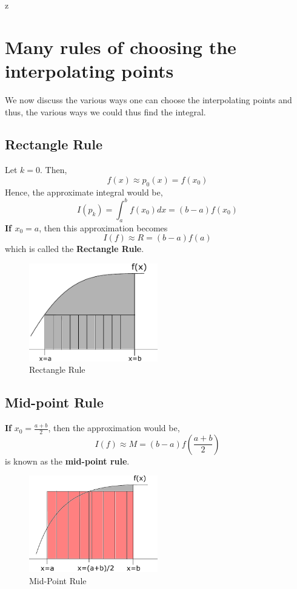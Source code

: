 z\documentclass[a4paper,12pt,twoside]{book}
\begin{document}
\section{Many rules of choosing the interpolating points}
We now discuss the various ways one can choose the interpolating points and thus, the various ways we could thus find the integral.
\subsection{Rectangle Rule}
Let $k = 0$. Then,
\[f(x) \approx p_0(x) = f(x_0)\]
Hence, the approximate integral would be,
\[I(p_k) = \int_a^bf(x_0) dx = (b-a)f(x_0)\]
\textbf{If $x_0 = a$}, then this approximation becomes
\begin{equation}
    I(f) \approx R = (b-a)f(a)
\end{equation}
which is called the \textbf{Rectangle Rule}.
\begin{figure}[h!]
    \centering
    \includegraphics[width=0.5\textwidth]{RectangleRule.pdf}
    \caption{Rectangle Rule}
    \label{fig:1}
\end{figure}
\subsection{Mid-point Rule}
\textbf{If} $x_0 = \frac{a+b}{2}$, then the approximation would be,
\begin{equation}
    I(f) \approx M = (b-a) f\left(\frac{a+b}{2}\right)
\end{equation}
is known as the \textbf{mid-point rule}.
\begin{figure}[h!]
    \centering
    \includegraphics[width = 0.5\textwidth]{MidPointRule.pdf}
    \caption{Mid-Point Rule}
    \label{fig:2}
\end{figure}
\end{document}
